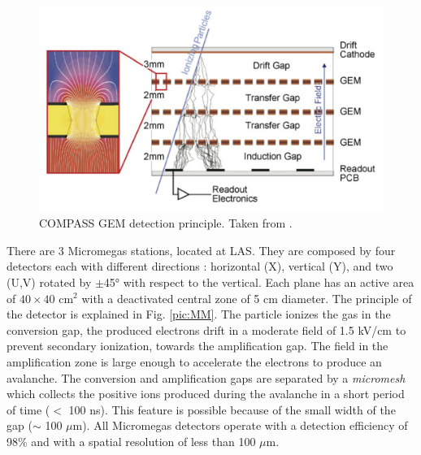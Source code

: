 \begin{figure}[!h]
  \centering
	\includegraphics[scale=0.5]{./gfx/GEM.png}
	\caption{COMPASS GEM detection principle. Taken from \cite{NIM}.}
	\label{pic:GEM}
\end{figure}

There are 3 Micromegas stations, located at LAS. They are composed by four detectors each with different directions : horizontal (X), vertical (Y), and two (U,V) rotated by $\pm$45° with respect to the vertical. Each plane has an active area of $40 \times 40$ cm$^2$ with a deactivated central zone of 5 cm diameter. The principle of the detector is explained in Fig. \ref{pic:MM}. The particle ionizes the gas in the conversion gap, the produced electrons drift in a moderate field of 1.5 kV/cm to prevent secondary ionization, towards the amplification gap. The field in the amplification zone is large enough to accelerate the electrons to produce an avalanche. The conversion and amplification gaps are separated by a \textit{micromesh} which collects the positive ions produced during the avalanche in a short period of time ($<$ 100 ns). This feature is possible because of the small width of the gap ($\sim$ 100 $\mu$m). All Micromegas detectors operate with a detection efficiency of 98\% and with a spatial resolution of less than 100 $\mu$m.

